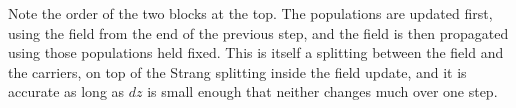Note the order of the two blocks at the top. The populations are updated first, using the field from the end of the previous step, and the field is then propagated using those populations held fixed. This is itself a splitting between the field and the carriers, on top of the Strang splitting inside the field update, and it is accurate as long as $dz$ is small enough that neither changes much over one step.
